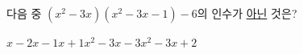 다음 중 $(x^2-3x)(x^2-3x-1)-6$의 인수가 \underline{아닌} 것은?
\begin{choices32}{$x-2$}{$x-1$}{$x+1$}{$x^2-3x-3$}{$x^2-3x+2$}\end{choices32}
